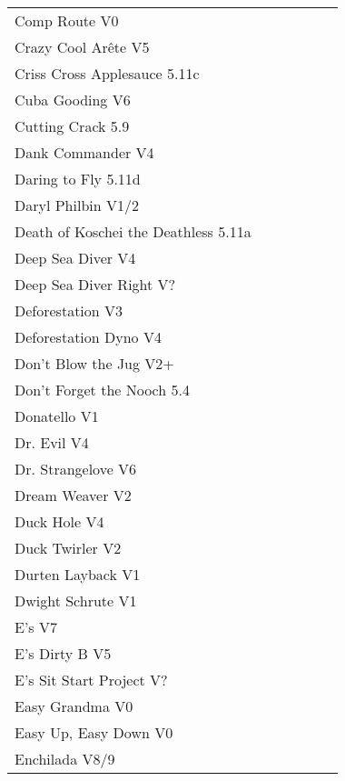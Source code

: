 \begin{flushleft}
\begin{center}
\begin{supertabular}{p{0.76\linewidth}p{0.08\linewidth}}
Comp Route V0 & \pageref{rt:Comp Route} \\
Crazy Cool Arête V5 & \pageref{rt:Crazy Cool Arête} \\
Criss Cross Applesauce 5.11c & \pageref{rt:Criss Cross Applesauce} \\
Cuba Gooding V6 & \pageref{rt:Cuba Gooding} \\
Cutting Crack 5.9 & \pageref{rt:Cutting Crack} \\
Dank Commander V4 & \pageref{rt:Dank Commander} \\
Daring to Fly 5.11d & \pageref{rt:Daring to Fly} \\
Daryl Philbin V1/2 & \pageref{rt:Daryl Philbin} \\
Death of Koschei the Deathless 5.11a & \pageref{rt:Death of Koschei the Deathless} \\
Deep Sea Diver V4 & \pageref{rt:Deep Sea Diver} \\
Deep Sea Diver Right V? & \pageref{rt:DSD 4} \\
Deforestation V3 & \pageref{rt:Deforestation} \\
Deforestation Dyno V4 & \pageref{vr:Deforestation Dyno} \\
Don't Blow the Jug V2+ & \pageref{rt:Don't Blow the Jug} \\
Don't Forget the Nooch 5.4 & \pageref{rt:Don't Forget the Nooch} \\
Donatello V1 & \pageref{rt:Donatello} \\
Dr. Evil V4 & \pageref{rt:Dr. Evil} \\
Dr. Strangelove V6 & \pageref{rt:Dr. Strangelove} \\
Dream Weaver V2 & \pageref{vr:Dream Weaver} \\
Duck Hole V4 & \pageref{rt:DT 1} \\
Duck Twirler V2 & \pageref{rt:Duck Twirler} \\
Durten Layback V1 & \pageref{rt:Durten Layback} \\
Dwight Schrute V1 & \pageref{rt:Dwight Schrute} \\
E's V7 & \pageref{rt:E's} \\
E's Dirty B V5 & \pageref{rt:E's Dirty B} \\
E's Sit Start Project V? & \pageref{vr:E's Sit Start Project} \\
Easy Grandma V0 & \pageref{rt:Easy Grandma} \\
Easy Up, Easy Down V0 & \pageref{rt:Easy Up, Easy Down} \\
Enchilada V8/9 & \pageref{rt:Enchilada} \\

\end{supertabular}
\end{center}
\end{flushleft}
